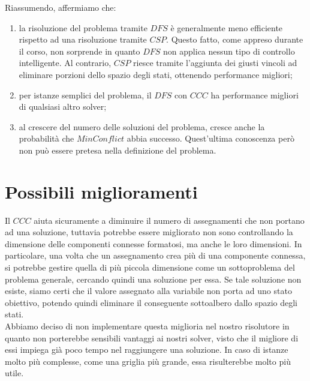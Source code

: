 Riassumendo, affermiamo che:
\begin{enumerate}
	\item la risoluzione del problema tramite $DFS$ è generalmente meno efficiente rispetto ad una risoluzione tramite $CSP$. Questo fatto, come appreso durante il corso, non sorprende in quanto $DFS$ non applica nessun tipo di controllo intelligente. Al contrario, $CSP$ riesce tramite l'aggiunta dei giusti vincoli ad eliminare porzioni dello spazio degli stati, ottenendo performance migliori; 

	\item per istanze semplici del problema, il $DFS$ con $CCC$ ha performance migliori di qualsiasi altro solver;
	\item al crescere del numero delle soluzioni del problema, cresce anche la probabilità che $MinConflict$ abbia successo. Quest'ultima conoscenza però non può essere pretesa nella definizione del problema.
\end{enumerate}
\section{Possibili miglioramenti}


Il $CCC$ aiuta sicuramente a diminuire il numero di assegnamenti che non portano ad una soluzione, tuttavia potrebbe essere migliorato non sono controllando la dimensione delle componenti connesse formatosi, ma anche le loro dimensioni. In particolare, una volta che un assegnamento crea più di una componente connessa, si potrebbe gestire quella di più piccola dimensione come un sottoproblema del problema generale, cercando quindi una soluzione per essa. Se tale soluzione non esiste, siamo certi che il valore assegnato alla variabile non porta ad uno stato obiettivo, potendo quindi eliminare il conseguente sottoalbero dallo spazio degli stati.\\
Abbiamo deciso di non implementare questa miglioria nel nostro risolutore in quanto non porterebbe sensibili vantaggi ai nostri solver, visto che il migliore di essi impiega già poco tempo nel raggiungere una soluzione. In caso di istanze molto più complesse, come una griglia più grande, essa risulterebbe molto più utile. 

